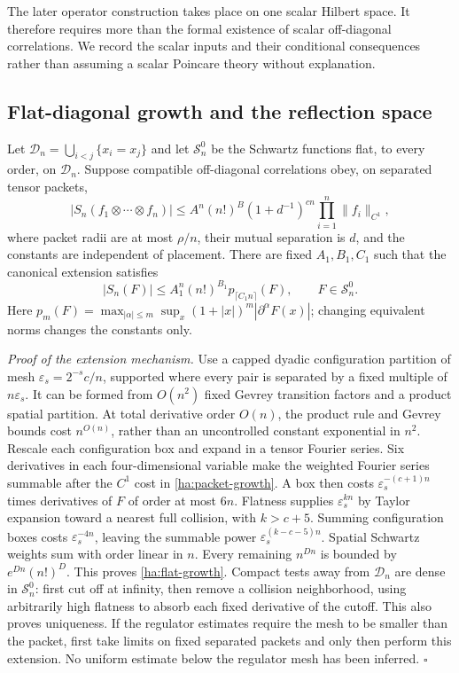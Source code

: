 The later operator construction takes place on one scalar Hilbert space.
It therefore requires more than the formal existence of scalar
off-diagonal correlations.  We record the scalar inputs and their
conditional consequences rather than assuming a scalar Poincare theory
without explanation.

\subsection{Flat-diagonal growth and the reflection space}

Let $\mathcal D_n=\bigcup_{i<j}\{x_i=x_j\}$ and let
$\mathcal S^0_n$ be the Schwartz functions flat, to every order, on
$\mathcal D_n$.  Suppose compatible off-diagonal correlations obey, on
separated tensor packets,
\begin{equation}
 |S_n(f_1\otimes\cdots\otimes f_n)|
 \leq A^n(n!)^B(1+d^{-1})^{cn}
               \prod_{i=1}^n\|f_i\|_{C^1},
 \label{ha:packet-growth}
\end{equation}
where packet radii are at most $\rho/n$, their mutual separation is $d$,
and the constants are independent of placement.  There are fixed
$A_1,B_1,C_1$ such that the canonical extension satisfies
\begin{equation}
 |S_n(F)|\leq A_1^n(n!)^{B_1}p_{\lceil C_1n\rceil}(F),
 \qquad F\in\mathcal S^0_n.
 \label{ha:flat-growth}
\end{equation}
Here $p_m(F)=\max_{|\alpha|\leq m}\sup_x
(1+|x|)^m|\partial^\alpha F(x)|$; changing equivalent norms changes
the constants only.

\emph{Proof of the extension mechanism.}
Use a capped dyadic configuration partition of mesh
$\varepsilon_s=2^{-s}c/n$, supported where every pair is separated
by a fixed multiple of $n\varepsilon_s$.  It can be formed from
$O(n^2)$ fixed Gevrey transition factors and a product spatial partition.
At total derivative order $O(n)$, the product rule and Gevrey bounds cost
$n^{O(n)}$, rather than an uncontrolled constant exponential in $n^2$.
Rescale each configuration box and expand in a tensor Fourier series.
Six derivatives in each four-dimensional variable make the weighted
Fourier series summable after the $C^1$ cost in
\eqref{ha:packet-growth}.  A box then costs
$\varepsilon_s^{-(c+1)n}$ times derivatives of $F$ of order at most
$6n$.  Flatness supplies $\varepsilon_s^{kn}$ by Taylor expansion toward
a nearest full collision, with $k>c+5$.  Summing configuration boxes
costs $\varepsilon_s^{-4n}$, leaving the summable power
$\varepsilon_s^{(k-c-5)n}$.  Spatial Schwartz weights sum with order
linear in $n$.  Every remaining $n^{Dn}$ is bounded by
$e^{Dn}(n!)^D$.  This proves \eqref{ha:flat-growth}.  Compact tests
away from $\mathcal D_n$ are dense in $\mathcal S^0_n$: first cut off
at infinity, then remove a collision neighborhood, using arbitrarily
high flatness to absorb each fixed derivative of the cutoff.  This
also proves uniqueness.  If the regulator estimates require the mesh
to be smaller than the packet, first take limits on fixed separated
packets and only then perform this extension.  No uniform estimate
below the regulator mesh has been inferred. \hfill$\square$

